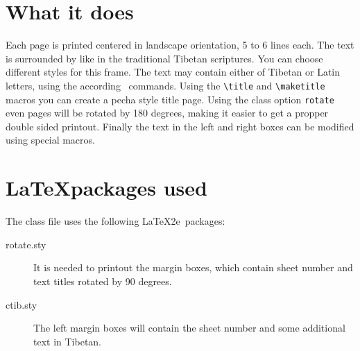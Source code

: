 \documentclass[a4paper,11pt]{article}
\begin{document}
\section{What it does}
Each page is printed centered in landscape orientation, 5 to 6 lines each. The text is surrounded by like in the traditional Tibetan scriptures. You can choose different styles for this frame. The text may contain either of Tibetan or Latin letters, using the according \TibTeX~commands. Using the \verb-\title- and \verb-\maketitle- macros you can create a pecha style title page. Using the class option \verb-rotate- even pages will be rotated by 180 degrees, making it easier to get a propper double sided printout. Finally the text in the left and right boxes can be modified using special macros.

\section{\LaTeX packages used}
The class file uses the following \LaTeX2e~packages:
\begin{description}
\item[rotate.sty] It is needed to printout the margin boxes, which contain sheet number and text titles rotated by 90 degrees. 
\item[ctib.sty] The left margin boxes will contain the sheet number and some additional text in Tibetan. 
\end{description} 
\end{document}
